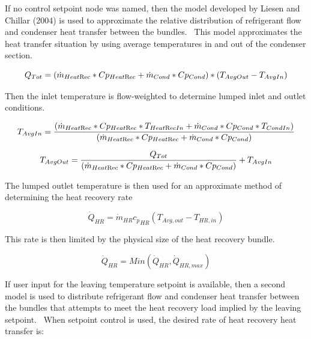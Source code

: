If no control setpoint node was named, then the model developed by Liesen and Chillar (2004) is used to approximate the relative distribution of refrigerant flow and condenser heat transfer between the bundles.~ This model approximates the heat transfer situation by using average temperatures in and out of the condenser section.

\begin{equation}
{Q_{Tot}} = ({\dot m_{Heat{\mathop{\rm Re}\nolimits} c}}*C{p_{Heat{\mathop{\rm Re}\nolimits} c}} + {\dot m_{Cond}}*C{p_{Cond}})*({T_{AvgOut}} - {T_{AvgIn}})
\end{equation}

Then the inlet temperature is flow-weighted to determine lumped inlet and outlet conditions.

\begin{equation}
{T_{AvgIn}} = \frac{{({{\dot m}_{Heat{\mathop{\rm Re}\nolimits} c}}*C{p_{Heat{\mathop{\rm Re}\nolimits} c}}*{T_{Heat{\mathop{\rm Re}\nolimits} cIn}} + {{\dot m}_{Cond}}*C{p_{Cond}}*{T_{CondIn}})}}{{({{\dot m}_{Heat{\mathop{\rm Re}\nolimits} c}}*C{p_{Heat{\mathop{\rm Re}\nolimits} c}} + {{\dot m}_{Cond}}*C{p_{Cond}})}}
\end{equation}

\begin{equation}
{T_{AvgOut}} = \frac{{{Q_{Tot}}}}{{({{\dot m}_{Heat{\mathop{\rm Re}\nolimits} c}}*C{p_{Heat{\mathop{\rm Re}\nolimits} c}} + {{\dot m}_{Cond}}*C{p_{Cond}})}} + {T_{AvgIn}}
\end{equation}

The lumped outlet temperature is then used for an approximate method of determining the heat recovery rate

\begin{equation}
{\dot Q_{HR}} = {\dot m_{HR}}{c_p}_{HR}\left( {{T_{Avg,out}} - {T_{HR,in}}} \right)
\end{equation}

This rate is then limited by the physical size of the heat recovery bundle.

\begin{equation}
{\dot Q_{HR}} = Min\left( {{{\dot Q}_{HR}},{{\dot Q}_{HR,max}}} \right)
\end{equation}

If user input for the leaving temperature setpoint is available, then a second model is used to distribute refrigerant flow and condenser heat transfer between the bundles that attempts to meet the heat recovery load implied by the leaving setpoint.~ When setpoint control is used, the desired rate of heat recovery heat transfer is:

